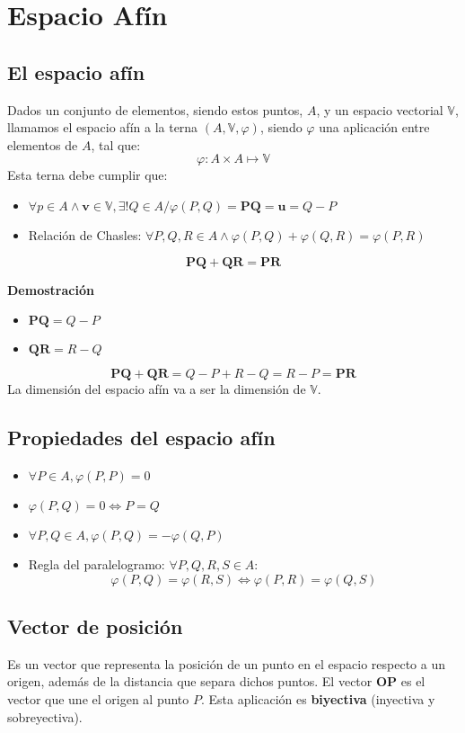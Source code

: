 \documentclass{./Geometria.tex}
\begin{document}
\chapter{Espacio Afín}
\section{El espacio afín}
Dados un conjunto de elementos, siendo estos puntos, $A$, y un espacio vectorial $\mathbb{V}$, llamamos el espacio afín a la terna $(A,\mathbb{V},\varphi)$, siendo $\varphi$ una aplicación entre elementos de $A$, tal que:
$$
\varphi: A \times A \mapsto \mathbb{V}
$$
Esta terna debe cumplir que:
\begin{itemize}
    \item $\forall p \in A \wedge \mathbf{v} \in \mathbb{V}, \exists! Q \in A/ \varphi(P,Q) = \mathbf{PQ}=\mathbf{u}=Q-P$
    \item Relaci\'on de Chasles: $\forall P,Q,R \in A \wedge\varphi (P,Q) + \varphi (Q,R) = \varphi (P,R)$
\end{itemize}
$$
\mathbf{PQ} + \mathbf{QR} = \mathbf{PR}
$$

\textbf{Demostraci\'on}
\begin{itemize}
    \item $\mathbf{PQ}=Q-P$
    \item $\mathbf{QR}=R-Q$ 
\end{itemize}
$$
\mathbf{PQ}+\mathbf{QR} = Q-P +R-Q = R-P = \mathbf{PR} 
$$
La dimensi\'on del espacio af\'in va a ser la dimensi\'on de $\mathbb{V}$. 

\section{Propiedades del espacio af\'in}
\begin{itemize}
    \item $\forall P \in A, \varphi(P,P)=0$
    \item $\varphi(P,Q)=0 \iff P=Q$
    \item $\forall P,Q \in A, \varphi(P,Q) = -\varphi(Q,P)$
    \item Regla del paralelogramo: $\forall P,Q,R,S \in A$:
$$
\varphi(P,Q)=\varphi(R,S) \iff \varphi (P,R) = \varphi (Q,S)
$$
\end{itemize}

\section{Vector de posici\'on}
Es un vector que representa la posici\'on de un punto en el espacio respecto a un origen, adem\'as de la distancia que separa dichos puntos. El vector $\mathbf{OP}$ es el vector que une el origen al punto $P$. Esta aplicaci\'on es \textbf{biyectiva} (inyectiva y sobreyectiva).
\end{document}
